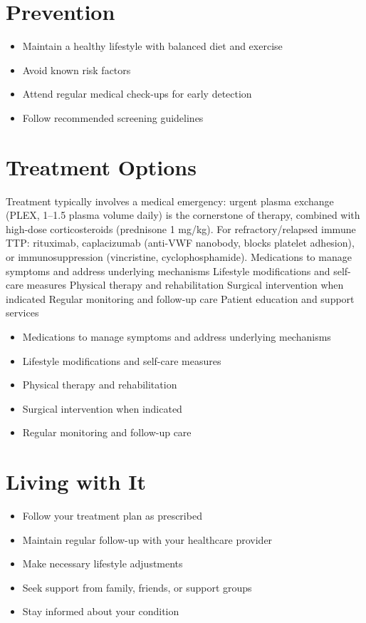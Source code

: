\section{Prevention}
\begin{itemize}[noitemsep]
  \item Maintain a healthy lifestyle with balanced diet and exercise
  \item Avoid known risk factors
  \item Attend regular medical check-ups for early detection
  \item Follow recommended screening guidelines
\end{itemize}
\section{Treatment Options}
Treatment typically involves a medical emergency: urgent plasma exchange (PLEX, 1--1.5 plasma volume daily) is the cornerstone of therapy, combined with high-dose corticosteroids (prednisone 1 mg/kg). For refractory/relapsed immune TTP: rituximab, caplacizumab (anti-VWF nanobody, blocks platelet adhesion), or immunosuppression (vincristine, cyclophosphamide). Medications to manage symptoms and address underlying mechanisms Lifestyle modifications and self-care measures Physical therapy and rehabilitation Surgical intervention when indicated Regular monitoring and follow-up care Patient education and support services

\begin{itemize}[noitemsep]
  \item Medications to manage symptoms and address underlying mechanisms
  \item Lifestyle modifications and self-care measures
  \item Physical therapy and rehabilitation
  \item Surgical intervention when indicated
  \item Regular monitoring and follow-up care
\end{itemize}
\section{Living with It}
\begin{itemize}[noitemsep]
  \item Follow your treatment plan as prescribed
  \item Maintain regular follow-up with your healthcare provider
  \item Make necessary lifestyle adjustments
  \item Seek support from family, friends, or support groups
  \item Stay informed about your condition
\end{itemize}
